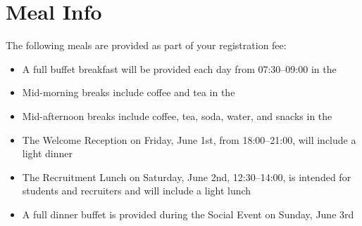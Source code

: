 \setheaders{}{}
\section{Meal Info}{}

The following meals are provided as part of your registration fee:

\begin{itemize}
\item A full buffet breakfast will be provided each day from 07:30--09:00 in the \BreakLoc
\item Mid-morning breaks include coffee and tea in the \BreakLoc
\item Mid-afternoon breaks include coffee, tea, soda, water, and snacks in the \BreakLoc
\item The Welcome Reception on Friday, June 1st, from 18:00--21:00, will include a light dinner
\item The Recruitment Lunch on Saturday, June 2nd, 12:30--14:00, is intended for students and recruiters and will include a light lunch
\item A full dinner buffet is provided during the Social Event on Sunday, June 3rd 
\end{itemize}
